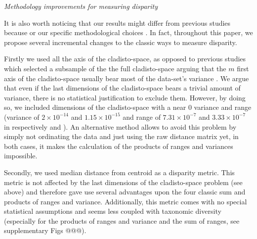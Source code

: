 \documentclass[12pt,letterpaper]{article}
\renewcommand{\subsection}[1]{%
\bigskip
\begin{center}
\begin{large}
\normalfont\itshape #1
\end{large}
\end{center}}
\begin{document}
\subsection{Methodology improvements for measuring disparity}
It is also worth noticing that our results might differ from previous studies because or our specific methodological choices \citep[e.g. compared to][]{Grossnickle2013,Wilson2013}.
In fact, throughout this paper, we propose several incremental changes to the classic ways to measure disparity.

Firstly we used all the axis of the cladisto-space, as opposed to previous studies which selected a subsample of the the full cladisto-space arguing that the $m$ first axis of the cladisto-space usually bear most of the data-set's variance \citep[e.g][]{brusatte50,cisneros2010,prentice2011,anderson2012using,Hughes20082013,bentonmodels2014}.
We argue that even if the last dimensions of the cladisto-space bears a trivial amount of variance, there is no statistical justification to exclude them.
However, by doing so, we included dimensions of the cladisto-space with a near $0$ variance and range (variance of $2\times10^{-14}$ and $1.15\times10^{-15}$ and range of $7.31\times10^{-7}$ and $3.33\times10^{-7}$ in respectively \citealt{Slater2012MEE} and \citealt{beckancient2014}).
An alternative method allows to avoid this problem by simply not ordinating the data and just using the raw distance matrix \citep[e.g.][]{bensonfaunal2014,Close2015} yet, in both cases, it makes the calculation of the products of ranges and variances impossible.

Secondly, we used median distance from centroid as a disparity metric.
This metric is not affected by the last dimensions of the cladisto-space problem (see above) and therefore gave use several advantages upon the four classic sum and products of ranges and variance.
Additionally, this metric comes with no special statistical assumptions and seems less coupled with taxonomic diversity (especially for the products of ranges and variance and the sum of ranges, see supplementary Figs @@@).
\end{document}
